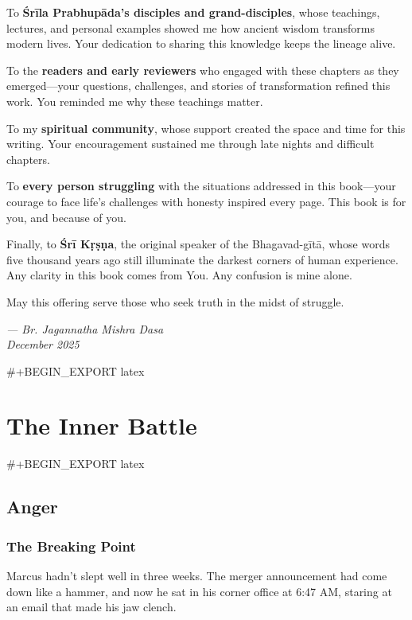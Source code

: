\documentclass[11pt,twoside]{book}
\renewcommand{\thepart}{}
\let\oldpart\part
\renewcommand{\part}[1]{\oldpart{#1}\renewcommand{\thepart}{\relax}}
\begin{document}
To \textbf{Śrīla Prabhupāda's disciples and grand-disciples}, whose teachings, lectures, and personal examples showed me how ancient wisdom transforms modern lives. Your dedication to sharing this knowledge keeps the lineage alive.

To the \textbf{readers and early reviewers} who engaged with these chapters as they emerged—your questions, challenges, and stories of transformation refined this work. You reminded me why these teachings matter.

To my \textbf{spiritual community}, whose support created the space and time for this writing. Your encouragement sustained me through late nights and difficult chapters.

To \textbf{every person struggling} with the situations addressed in this book—your courage to face life's challenges with honesty inspired every page. This book is for you, and because of you.

Finally, to \textbf{Śrī Kṛṣṇa}, the original speaker of the Bhagavad-gītā, whose words five thousand years ago still illuminate the darkest corners of human experience. Any clarity in this book comes from You. Any confusion is mine alone.

May this offering serve those who seek truth in the midst of struggle.

\vspace{1\baselineskip}
\noindent\textit{— Br. Jagannatha Mishra Dasa}\\
\textit{December 2025}

\clearpage
\pagestyle{fancy}
\setcounter{page}{1}

#+BEGIN_EXPORT latex
\part{The Inner Battle}

#+BEGIN_EXPORT latex
\chapter{Anger}

\section*{The Breaking Point}

Marcus hadn't slept well in three weeks. The merger announcement had come down like a hammer, and now he sat in his corner office at 6:47 AM, staring at an email that made his jaw clench.
\end{document}
